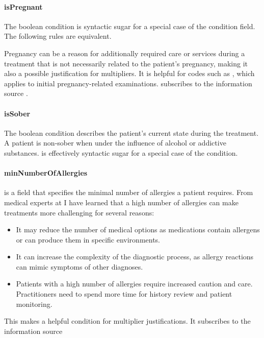 \paragraph{isPregnant}
The \isPregnant boolean condition is syntactic sugar for a special case of the \anamnesisBlocks condition field.
The following rules are equivalent.

Pregnancy can be a reason for additionally required care or services during a treatment that is not necessarily related to the patient's pregnancy,
making it also a possible justification for multipliers.
It is helpful for codes such as , which applies to initial pregnancy-related examinations.
 subscribes to the information source .

\paragraph{isSober}
The \isSober boolean condition describes the patient's current state during the treatment.
A patient is non-sober when under the influence of alcohol or addictive substances.
\isSober is effectively syntactic sugar for a special case of the \anamnesisBlocks condition.



\paragraph{minNumberOfAllergies}\label{par:minNumberOfAllergies}
\minNumberOfAllergies is a field that specifies the minimal number of allergies a patient requires.
From medical experts at \AV I have learned that a high number of allergies can make treatments more challenging for several reasons:
\begin{itemize}
    \item It may reduce the number of medical options as medications contain allergens or can produce them in specific environments.
    \item It can increase the complexity of the diagnostic process, as allergy reactions can mimic symptoms of other diagnoses.
    \item Patients with a high number of allergies require increased caution and care.
    Practitioners need to spend more time for history review and patient monitoring.
\end{itemize}
This makes \minNumberOfAllergies a helpful condition for multiplier justifications.
It subscribes to the information source 

